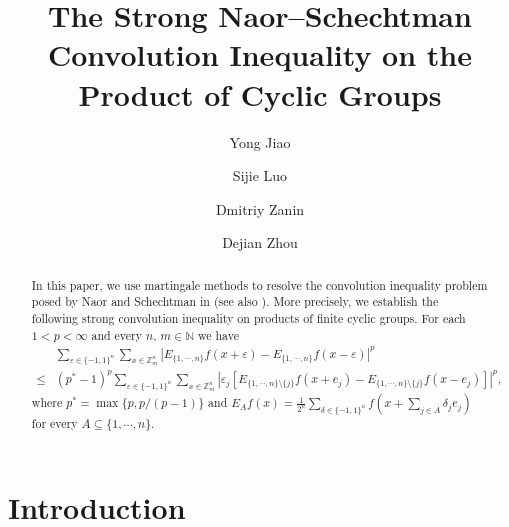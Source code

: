 \documentclass{amsart}
\numberwithin{equation}{section}
\newcommand{\Z}{{\mathbb{Z}^{n}_{m}}}
\begin{document}
\title[Strong Convolution Inequality]{The Strong Naor--Schechtman Convolution Inequality on the Product of Cyclic Groups}


\author[Jiao]{Yong Jiao}
\address{School of Mathematics and Statistics, HNP-LAMA, Central South University, Changsha 410075, China}


\author[Luo]{Sijie Luo}
\address{School of Mathematics and Statistics, HNP-LAMA, Central South University, Changsha 410075, China}

\author[Zanin]{Dmitriy Zanin}
\address{School of Mathematics and Statistics, HNP-LAMA, Central South University, Changsha 410075, China}

\author[Zhou]{Dejian Zhou}
\address{School of Mathematics and Statistics, HNP-LAMA, Central South University, Changsha 410075, China}
\date{}

\begin{abstract}
In this paper, we use martingale methods to resolve the convolution inequality problem posed by Naor and Schechtman in \cite[Question 6.1]{N-S2016} (see also \cite{Na2016}). More precisely, we establish the following strong convolution inequality on products of finite cyclic groups. For each $1<p<\infty$ and every $n$, $m\in \mathbb{N}$ we have
\[
\begin{split}
&\sum_{\varepsilon\in \{-1,1\}^{n}}\sum_{x\in \Z}\left|E_{\{1,\cdots,n\}}f(x+\varepsilon)-E_{\{1,\cdots,n\}}f(x-\varepsilon)\right|^{p}\\
\leq& (p^{*}-1)^{p}\sum_{\varepsilon\in \{-1,1\}^{n}}\sum_{x\in \Z}\left|\varepsilon_{j}\left[E_{\{1,\cdots,n\}\setminus\{j\}}f(x+e_{j})-E_{\{1,\cdots,n\}\setminus\{j\}}f(x-e_{j})\right]\right|^{p},
\end{split}
\]
where $p^{*}=\max\{p,p/(p-1)\}$ and $E_{A}f(x)=\frac{1}{2^{n}}\sum_{\delta\in \{-1,1\}^{n}}f\left(x+\sum_{j\in A}\delta_{j}e_{j}\right)$ for every $A\subseteq \{1,\cdots,n\}$.
\end{abstract}

\maketitle

\section{Introduction}
\end{document}

